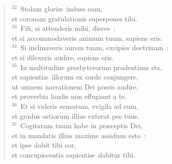 \begin{flushleft}
\begin{verse}
${}^{32}$~Stolam glori\ae\ indues eam,\\ et coronam gratulationis superpones tibi.\\
${}^{33}$~Fili, si attenderis mihi, disces~:\\ et si accommodaveris animum tuum, sapiens eris.\\
${}^{34}$~Si inclinaveris aurem tuam, excipies doctrinam~:\\ et si dilexeris audire, sapiens eris.\\
${}^{35}$~In multitudine presbyterorum prudentium sta,\\ et sapienti\ae\ illorum ex corde conjungere,\\ ut omnem narrationem Dei possis audire,\\ et proverbia laudis non effugiant a te.\\
${}^{36}$~Et si videris sensatum, evigila ad eum,\\ et gradus ostiorum illius exterat pes tuus.\\
${}^{37}$~Cogitatum tuum habe in pr\ae ceptis Dei,\\ et in mandatis illius maxime assiduus esto~:\\ et ipse dabit tibi cor,\\ et concupiscentia sapienti\ae\ dabitur tibi.\end{verse}\end{flushleft}


